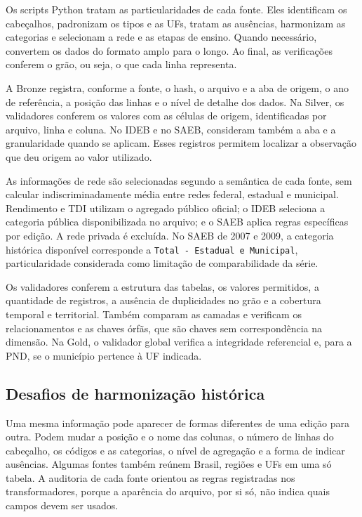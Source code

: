 Os scripts Python tratam as particularidades de cada fonte. Eles identificam os cabeçalhos, padronizam os tipos e as UFs, tratam as ausências, harmonizam as categorias e selecionam a rede e as etapas de ensino. Quando necessário, convertem os dados do formato amplo para o longo. Ao final, as verificações conferem o grão, ou seja, o que cada linha representa.

A Bronze registra, conforme a fonte, o hash, o arquivo e a aba de origem, o ano de referência, a posição das linhas e o nível de detalhe dos dados. Na Silver, os validadores conferem os valores com as células de origem, identificadas por arquivo, linha e coluna. No IDEB e no SAEB, consideram também a aba e a granularidade quando se aplicam. Esses registros permitem localizar a observação que deu origem ao valor utilizado.

As informações de rede são selecionadas segundo a semântica de cada fonte, sem calcular indiscriminadamente média entre redes federal, estadual e municipal. Rendimento e TDI utilizam o agregado público oficial; o IDEB seleciona a categoria pública disponibilizada no arquivo; e o SAEB aplica regras específicas por edição. A rede privada é excluída. No SAEB de 2007 e 2009, a categoria histórica disponível corresponde a \texttt{Total - Estadual e Municipal}, particularidade considerada como limitação de comparabilidade da série.

Os validadores conferem a estrutura das tabelas, os valores permitidos, a quantidade de registros, a ausência de duplicidades no grão e a cobertura temporal e territorial. Também comparam as camadas e verificam os relacionamentos e as chaves órfãs, que são chaves sem correspondência na dimensão. Na Gold, o validador global verifica a integridade referencial e, para a PND, se o município pertence à UF indicada.

\subsection{Desafios de harmonização histórica}

Uma mesma informação pode aparecer de formas diferentes de uma edição para outra. Podem mudar a posição e o nome das colunas, o número de linhas do cabeçalho, os códigos e as categorias, o nível de agregação e a forma de indicar ausências. Algumas fontes também reúnem Brasil, regiões e UFs em uma só tabela. A auditoria de cada fonte orientou as regras registradas nos transformadores, porque a aparência do arquivo, por si só, não indica quais campos devem ser usados.


